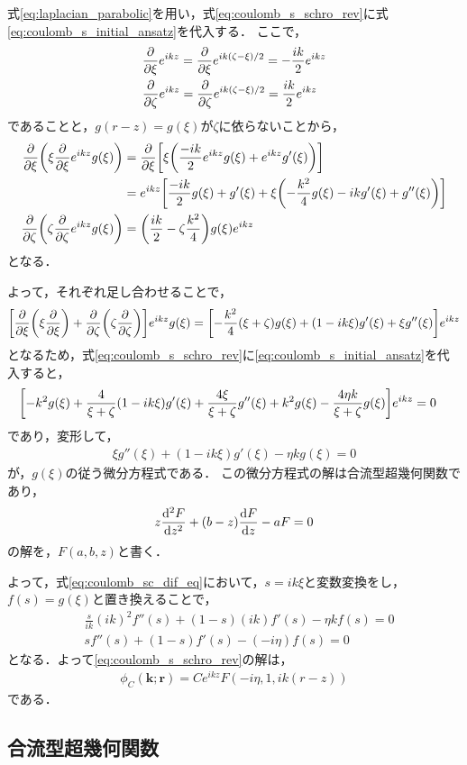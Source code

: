 \documentclass[a4paper,11pt]{ltjsarticle}
\begin{document}
式\ref{eq:laplacian_parabolic}を用い，式\ref{eq:coulomb_s_schro_rev}に式\ref{eq:coulomb_s_initial_ansatz}を代入する．
ここで，
\begin{align*}
  &\pdv{\xi} e^{ikz} = \pdv{\xi} e^{ik(\zeta-\xi)/2} = - \frac{ik}{2} e^{ikz}\\
  &\pdv{\zeta} e^{ikz} =   \pdv{\zeta} e^{ik(\zeta-\xi)/2} =  \frac{ik}{2} e^{ikz}
\end{align*}
であることと，$g(r-z) = g(\xi)$が$\zeta$に依らないことから，
\begin{align*}
  \pdv{\xi}\qty(\xi \pdv{\xi} e^{ikz}g(\xi)) 
  &= \pdv{\xi}\qty[\xi\qty(\frac{-ik}{2}e^{ikz}g(\xi) + e^{ikz}g'(\xi))] \\
  &=e^{ikz}\qty[\frac{-ik}{2} g(\xi) + g'(\xi) + \xi\qty(-\frac{k^2}{4} g(\xi) - ikg'(\xi) + g''(\xi))] \\
  \pdv{\zeta}\qty(\zeta \pdv{\zeta} e^{ikz} g(\xi)) &= \qty( \frac{ik}{2}  - \zeta \frac{k^2}{4})g(\xi)e^{ikz}
\end{align*}
となる．

よって，それぞれ足し合わせることで，
\begin{align*}
  \qty[\pdv{\xi}\qty(\xi\pdv{\xi}) + \pdv{\zeta}\qty(\zeta\pdv{\zeta})]e^{ikz} g(\xi)
  = \qty[ - \frac{k^2}{4}(\xi+\zeta)g(\xi) + \qty(1 - ik\xi )g'(\xi) + \xi g''(\xi)] e^{ikz}
\end{align*}
となるため，式\ref{eq:coulomb_s_schro_rev}に\ref{eq:coulomb_s_initial_ansatz}を代入すると，
\begin{align}\label{eq:scat_sol_dif_eq}
&\qty[-k^2 g(\xi) + \frac{4}{\xi + \zeta} \qty(1-ik\xi )g'(\xi) + \frac{4\xi}{\xi+ \zeta}g''(\xi) + k^2g(\xi) - \frac{4\eta k}{\xi + \zeta} g(\xi)] e^{ikz} = 0 
\end{align}
であり，変形して，
\begin{align}\label{eq:coulomb_sc_dif_eq}
  \xi g''(\xi) + (1 - ik\xi) g'(\xi) - \eta k g(\xi) = 0
\end{align}
が，$g(\xi)$の従う微分方程式である．
この微分方程式の解は合流型超幾何関数であり，
\begin{align}\label{eq:cofluent_hyp_geom_dif}
  z \dv[2]{F}{z} + (b - z) \dv{F}{z} - aF = 0
\end{align}
の解を，$F(a,b,z)$と書く．

よって，式\ref{eq:coulomb_sc_dif_eq}において，$s = ik\xi$と変数変換をし，$f(s) = g(\xi)$と置き換えることで，
\begin{align*}
  &\frac{s}{ik} (ik)^2 f''(s) + (1 - s) (ik) f'(s) - \eta k f(s) = 0 \\
  & s f''(s) + (1-s) f'(s) - (- i \eta) f(s)  = 0
\end{align*}
となる．よって\ref{eq:coulomb_s_schro_rev}の解は，
\begin{align}\label{eq:coulomb_sc_solution}
  \phi_C(\bm{k};\bm{r}) = C e^{ikz} F(-i\eta, 1, ik(r-z))
\end{align}
である．
\subsection{合流型超幾何関数}

\newpage
% 
% 
\printbibliography%
\end{document}
